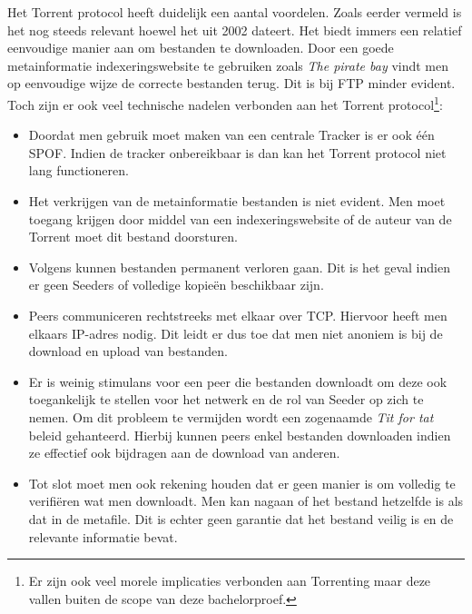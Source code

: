 Het Torrent protocol heeft duidelijk een aantal voordelen. Zoals eerder vermeld is het nog steeds relevant hoewel het uit 2002 dateert. Het biedt immers een relatief eenvoudige manier aan om bestanden te downloaden. Door een goede metainformatie indexeringswebsite te gebruiken zoals \textit{The pirate bay} vindt men op eenvoudige wijze de correcte bestanden terug. Dit is bij FTP minder evident.\\

Toch zijn er ook veel technische nadelen verbonden aan het Torrent protocol\footnote{Er zijn ook veel morele implicaties verbonden aan Torrenting maar deze vallen buiten de scope van deze bachelorproef.}:

\begin{itemize}
\item Doordat men gebruik moet maken van een centrale Tracker is er ook één SPOF. Indien de tracker onbereikbaar is dan kan het Torrent protocol niet lang functioneren.\\

\item Het verkrijgen van de metainformatie bestanden is niet evident. Men moet toegang krijgen door middel van een indexeringswebsite of de auteur van de Torrent moet dit bestand doorsturen.\\

\item Volgens \textcite{Thanekar2010} kunnen bestanden permanent verloren gaan. Dit is het geval indien er geen Seeders of volledige kopieën beschikbaar zijn.\\

\item Peers communiceren rechtstreeks met elkaar over TCP. Hiervoor heeft men elkaars IP-adres nodig. Dit leidt er dus toe dat men niet anoniem is bij de download en upload van bestanden.\\

\item Er is weinig stimulans voor een peer die bestanden downloadt om deze ook toegankelijk te stellen voor het netwerk en de rol van Seeder op zich te nemen. Om dit probleem te vermijden wordt een zogenaamde \textit{Tit for tat} beleid gehanteerd. Hierbij kunnen peers enkel bestanden downloaden indien ze effectief ook bijdragen aan de download van anderen.\\

\item Tot slot moet men ook rekening houden dat er geen manier is om volledig te verifiëren wat men downloadt. Men kan nagaan of het bestand hetzelfde is als dat in de metafile. Dit is echter geen garantie dat het bestand veilig is en de relevante informatie bevat. 
\end{itemize}

